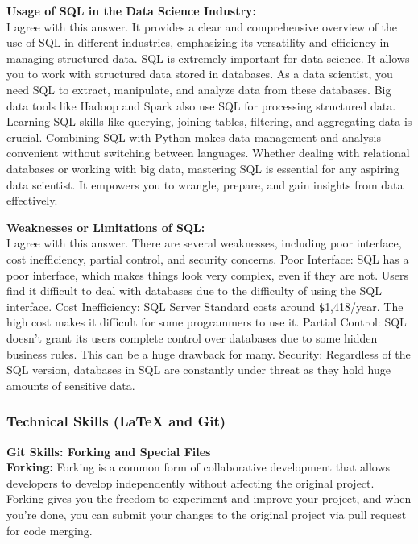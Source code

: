 \documentclass[a4paper, 11pt]{report}
\begin{document}
\textbf{Usage of SQL in the Data Science Industry:} \\
\noindent I agree with this answer. It provides a clear and comprehensive overview of the use of SQL in different industries, emphasizing its versatility and efficiency in managing structured data. SQL is extremely important for data science. It allows you to work with structured data stored in databases. As a data scientist, you need SQL to extract, manipulate, and analyze data from these databases. Big data tools like Hadoop and Spark also use SQL for processing structured data. Learning SQL skills like querying, joining tables, filtering, and aggregating data is crucial. Combining SQL with Python makes data management and analysis convenient without switching between languages. Whether dealing with relational databases or working with big data, mastering SQL is essential for any aspiring data scientist. It empowers you to wrangle, prepare, and gain insights from data effectively.\cite{Analytics}

\textbf{Weaknesses or Limitations of SQL:} \\
\noindent I agree with this answer. There are several weaknesses, including poor interface, cost inefficiency, partial control, and security concerns. 
Poor Interface: SQL has a poor interface, which makes things look very complex, even if they are not. Users find it difficult to deal with databases due to the difficulty of using the SQL interface.
Cost Inefficiency: SQL Server Standard costs around \verb|$|1,418/year. The high cost makes it difficult for some programmers to use it.
Partial Control: SQL doesn't grant its users complete control over databases due to some hidden business rules. This can be a huge drawback for many.
Security: Regardless of the SQL version, databases in SQL are constantly under threat as they hold huge amounts of sensitive data.\cite{Unstop}

\subsubsection{Technical Skills (LaTeX and Git)}
\textbf{\large{Git Skills: Forking and Special Files}}\\
\textbf{Forking:}
\noindent Forking is a common form of collaborative development that allows developers to develop independently without affecting the original project. Forking gives you the freedom to experiment and improve your project, and when you're done, you can submit your changes to the original project via pull request for code merging.
\end{document}
